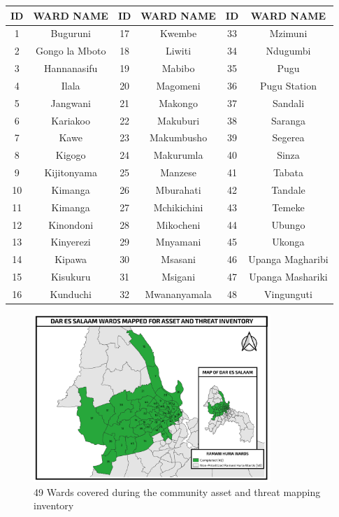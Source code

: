 \documentclass[a4paper,12pt,twoside]{article}
\begin{document}
\begin{center}
\begin{tabular}{|c|c|c|c|c|c|}
\hline
ID & WARD NAME & ID & WARD NAME & ID & WARD NAME\\
\hline
1 & Buguruni & 17 & Kwembe & 33 & Mzimuni\\
2 & Gongo la Mboto & 18 & Liwiti & 34 & Ndugumbi\\
3 & Hannanasifu & 19 & Mabibo & 35 & Pugu\\
4 & Ilala & 20  & Magomeni & 36 & Pugu Station\\
5 & Jangwani & 21 & Makongo & 37 & Sandali\\
6 & Kariakoo & 22 & Makuburi & 38 & Saranga\\
7 & Kawe & 23 & Makumbusho & 39 & Segerea\\
8 & Kigogo & 24 & Makurumla & 40 & Sinza\\
9 & Kijitonyama & 25 & Manzese & 41 & Tabata\\
10 & Kimanga & 26 & Mburahati & 42 & Tandale\\
11 & Kimanga & 27 & Mchikichini & 43 & Temeke\\
12 & Kinondoni & 28 & Mikocheni & 44 & Ubungo\\
13 & Kinyerezi & 29 & Mnyamani & 45 & Ukonga\\
14 & Kipawa & 30 & Msasani & 46 & Upanga Magharibi\\
15 & Kisukuru & 31 & Msigani & 47 & Upanga Mashariki\\
16 & Kunduchi & 32 & Mwananyamala & 48 & Vingunguti\\
 \hline
\end{tabular}
\end{center}
\begin{figure}[h]
  \color{RHgreen}\caption{49 Wards covered during the community asset and threat mapping inventory}
  \centering
  \includegraphics[width=0.8\textwidth]{images/Asset&Threat.png}
\end{figure}
\end{document}

